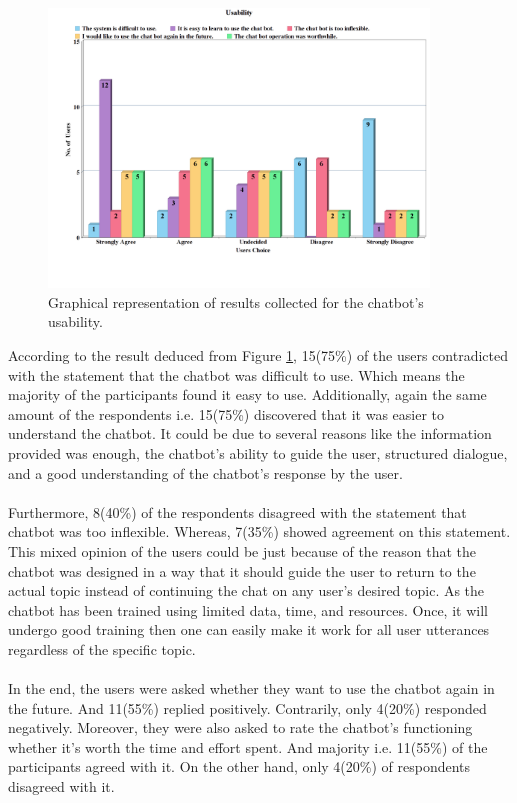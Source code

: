 \begin{figure}[!h]
    \centering
    \includegraphics[width=0.9\textwidth]{img/Usability_Updated_2.png}
    \caption{Graphical representation of results collected for the chatbot's usability.}
    \label{fig:usabil}
\end{figure}

\noindent
According to the result deduced from Figure \ref{fig:usabil}, 15(75\%) of the users contradicted with the statement that the chatbot was difficult to use. Which means the majority of the participants found it easy to use. Additionally, again the same amount of the respondents i.e. 15(75\%) discovered that it was easier to understand the chatbot. It could be due to several reasons like the information provided was enough, the chatbot's ability to guide the user, structured dialogue, and a good understanding of the chatbot's response by the user.
\\~\\
Furthermore, 8(40\%) of the respondents disagreed with the statement that chatbot was too inflexible. Whereas, 7(35\%) showed agreement on this statement. This mixed opinion of the users could be just because of the reason that the chatbot was designed in a way that it should guide the user to return to the actual topic instead of continuing the chat on any user's desired topic. As the chatbot has been trained using limited data, time, and resources. Once, it will undergo good training then one can easily make it work for all user utterances regardless of the specific topic.
\\~\\
In the end, the users were asked whether they want to use the chatbot again in the future. And 11(55\%) replied positively. Contrarily, only 4(20\%) responded negatively. Moreover, they were also asked to rate the chatbot's functioning whether it's worth the time and effort spent. And majority i.e. 11(55\%) of the participants agreed with it. On the other hand, only 4(20\%) of respondents disagreed with it.

